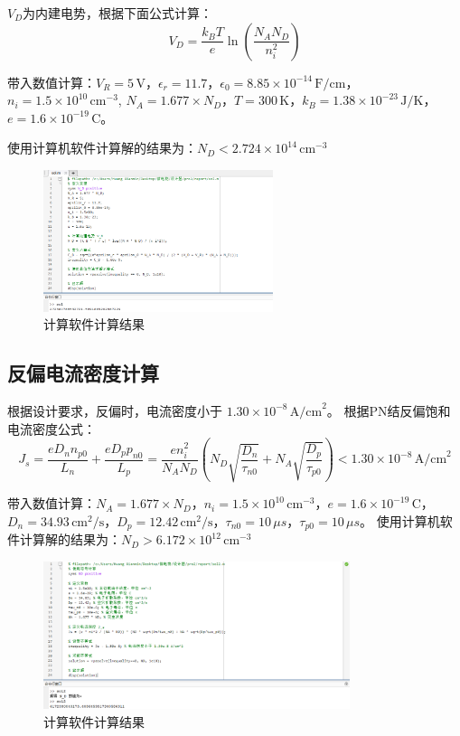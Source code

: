 \documentclass[12pt,hyperref,a4paper,UTF8]{ctexart}
\begin{document}
$V_D$为内建电势，根据下面公式计算：
\[ V_D = \frac{k_B T}{e} \ln \left( \frac{N_A N_D}{n_i^2} \right) \]

带入数值计算：$V_R=5\, \text{V}$，$\epsilon_r=11.7$，$\epsilon_0=8.85 \times 10^{-14} \, \text{F/cm}$，$n_i=1.5 \times 10^{10} \, \text{cm}^{-3}$, $N_A=1.677 \times N_D$，$T=300\, \text{K}$，$k_B=1.38 \times 10^{-23} \, \text{J/K}$，$e=1.6 \times 10^{-19} \, \text{C}$。

使用计算机软件计算解的结果为：$N_D < 2.724 \times 10^{14} \, \text{cm}^{-3}$
\begin{figure}[H]
    \centering
    \includegraphics[width=0.6\textwidth]{figures/fig/image2.png}
    \caption{计算软件计算结果}
\end{figure}



\subsection*{反偏电流密度计算}
根据设计要求，反偏时，电流密度小于 $1.30 \times 10^{-8}\, \text{A/cm}^2$。
根据PN结反偏饱和电流密度公式：
\[ J_s = \frac{e D_n n_{p0}}{L_n} + \frac{e D_p p_{n0}}{L_p} = \frac{e n_i^2}{N_A N_D} \left( N_D \sqrt{\frac{D_n}{\tau_{n0}}} + N_A \sqrt{\frac{D_p}{\tau_{p0}}} \right) < 1.30 \times 10^{-8}\, \text{A/cm}^2 \]

带入数值计算：$N_A=1.677 \times N_D$，$n_i=1.5 \times 10^{10} \, \text{cm}^{-3}$，$e=1.6 \times 10^{-19} \, \text{C}$，$D_n=34.93 \, \text{cm}^2/\text{s}$，$D_p=12.42 \, \text{cm}^2/\text{s}$，$\tau_{n0}=10 \, \mu s$，$\tau_{p0}=10 \, \mu s$。
使用计算机软件计算解的结果为：$N_D > 6.172 \times 10^{12} \, \text{cm}^{-3}$
\begin{figure}[H]
    \centering
    \includegraphics[width=0.8\textwidth]{figures/fig/image3.png}
    \caption{计算软件计算结果}
\end{figure}
\end{document}
